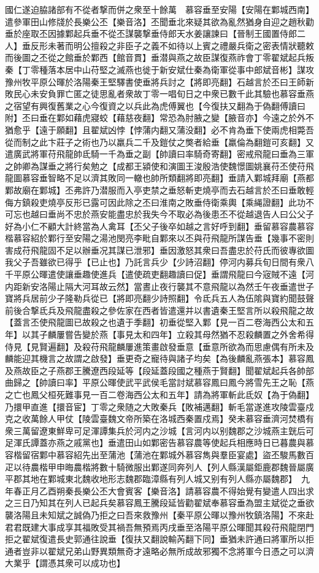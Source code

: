 國仁遂迫脇諸部有不從者撃而併之衆至十餘萬　慕容垂至安陽【安陽在鄴城西南】遣參軍田山修牋於長樂公丕【樂音洛】丕聞垂北來疑其欲為亂然猶身自迎之趙秋勸垂於座取丕因據鄴起兵垂不從丕謀襲撃垂侍郎天水姜讓諫曰【晉制王國置侍郎二人】垂反形未著而明公擅殺之非臣子之義不如待以上賓之禮嚴兵衛之密表情狀聽敕而後圖之丕從之館垂於鄴西【館音貫】垂潜與燕之故臣謀復燕祚會丁零翟斌起兵叛秦【丁零種落本居中山苻堅之滅燕也徙于新安斌仕秦為衛軍從事中郎斌音彬】謀攻豫州牧平原公暉於洛陽秦王堅驛書使垂將兵討之【將即亮翻】石越言於丕曰王師新敗民心未安負罪亡匿之徒思亂者衆故丁零一唱旬日之中衆已數千此其驗也慕容垂燕之宿望有興復舊業之心今復資之以兵此為虎傅翼也【今復扶又翻為于偽翻傅讀曰附】丕曰垂在鄴如藉虎寢蛟【藉慈夜翻】常恐為肘腋之變【腋音亦】今遠之於外不猶愈乎【遠于願翻】且翟斌凶悖【悖蒲内翻又蒲没翻】必不肯為垂下使兩虎相斃吾從而制之此卞莊子之術也乃以羸兵二千及鎧仗之獘者給垂【羸倫為翻鎧可亥翻】又遣廣武將軍苻飛龍帥氐騎一千為垂之副【帥讀曰率騎奇寄翻】密戒飛龍曰垂為三軍之帥卿為謀垂之將行矣勉之【成都王潁使和演圖王浚殷浩使魏憬圖姚襄苻丕使苻飛龍圖慕容垂智略不足以濟其敗同一轍也帥所類翻將即亮翻】垂請入鄴城拜廟【燕都鄴故廟在鄴城】丕弗許乃潜服而入亭吏禁之垂怒斬吏燒亭而去石越言於丕曰垂敢輕侮方鎮殺吏燒亭反形已露可因此除之丕曰淮南之敗垂侍衛乘輿【乘䋲證翻】此功不可忘也越曰垂尚不忠於燕安能盡忠於我失今不取必為後患丕不從越退告人曰公父子好為小仁不顧大計終當為人禽耳【丕父子後卒如越之言好呼到翻】垂留慕容農慕容楷慕容紹於鄴行至安陽之湯池閔亮李毗自鄴來以丕與苻飛龍所謀告垂【幾事不密則害成苻飛龍固不足以辦垂况其謀已泄邪】垂因激怒其衆曰吾盡忠於苻氏而彼專欲圖我父子吾雖欲已得乎【已止也】乃託言兵少【少詩沼翻】停河内募兵旬日間有衆八千平原公暉遣使讓垂趣使進兵【遣使疏吏翻趣讀曰促】垂謂飛龍曰今宼賊不遠【河内距新安洛陽止隔大河耳故云然】當晝止夜行襲其不意飛龍以為然壬午夜垂遣世子寶將兵居前少子隆勒兵從已【將即亮翻少詩照翻】令氐兵五人為伍隂與寶約聞鼓聲前後合撃氐兵及飛龍盡殺之參佐家在西者皆遣還并以書遺秦王堅言所以殺飛龍之故【蓋言丕使飛龍圖已故殺之也遺于季翻】初垂從堅入鄴【見一百二卷海西公太和五年】以其子麟屢嘗告變於燕【事見太和四年】立殺其母然猶不忍殺麟置之外舍希得侍見【見賢遍翻】及殺苻飛龍麟屢進策畫啟發垂意【垂意所欲為而思慮偶有所未及麟能迎其機言之故謂之啟發】垂更奇之寵待與諸子均矣【為後麟亂燕張本】慕容鳳及燕故臣之子燕郡王騰遼西段延等【段延蓋段國之種燕于賢翻】聞翟斌起兵各帥部曲歸之【帥讀曰率】平原公暉使武平武侯毛當討斌慕容鳳曰鳳今將雪先王之恥【燕之亡也鳳父桓死難事見一百二卷海西公太和五年】請為將軍斬此氐奴【為于偽翻】乃擐甲直進【擐音宦】丁零之衆随之大敗秦兵【敗補邁翻】斬毛當遂進攻陵雲臺戍克之收萬餘人甲仗【陵雲臺魏文帝所築在洛城西秦置戍焉】癸未慕容垂濟河焚橋有衆三萬留遼東鮮卑可足渾譚集兵於河内之沙城【言河内以别魏郡之沙城燕主皝后可足渾氏譚蓋亦燕之戚黨也】垂遣田山如鄴密告慕容農等使起兵相應時日已暮農與慕容楷留宿鄴中慕容紹先出至蒲池【蒲池在鄴城外慕容雋與羣臣宴處】盜丕駿馬數百疋以待農楷甲申晦農楷將數十騎微服出鄴遂同奔列人【列人縣漢屬鉅鹿郡魏晉屬廣平郡其地在鄴城東北魏收地形志魏郡臨漳縣有列人城又别有列人縣亦屬魏郡】　九年春正月乙酉朔秦長樂公丕大會賓客【樂音洛】請慕容農不得始覺有變遣人四出求之三日乃知其在列人已起兵矣慕容鳳王騰段延皆勸翟斌奉慕容垂為盟主斌從之垂欲襲洛陽且未知斌之誠偽乃拒之曰吾來救豫州【秦平原公暉以豫州牧鎮洛陽】不來赴君君既建大事成享其福敗受其禍吾無預焉丙戌垂至洛陽平原公暉聞其殺苻飛龍閉門拒之翟斌復遣長史郭通往說垂【復扶又翻說輸芮翻下同】垂猶未許通曰將軍所以拒通者豈非以翟斌兄弟山野異類無奇才遠略必無所成故邪獨不念將軍今日憑之可以濟大業乎【謂憑其衆可以成功也】